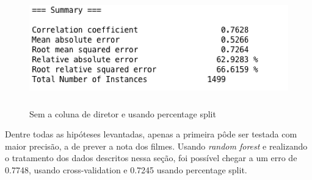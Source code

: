 \begin{figure}[H]
\centering
\includegraphics[height=5cm]{imagens/no_director_split.png}
\caption{Sem a coluna de diretor e usando percentage split}
\label{nodirectorsplit}
\end{figure}

Dentre todas as hipóteses levantadas, apenas a primeira pôde ser testada com maior precisão, a de prever a nota dos filmes. Usando \textit{random forest} e realizando o tratamento dos dados descritos nessa seção, foi possível chegar a um erro de 0.7748, usando cross-validation e 0.7245 usando percentage split. 
